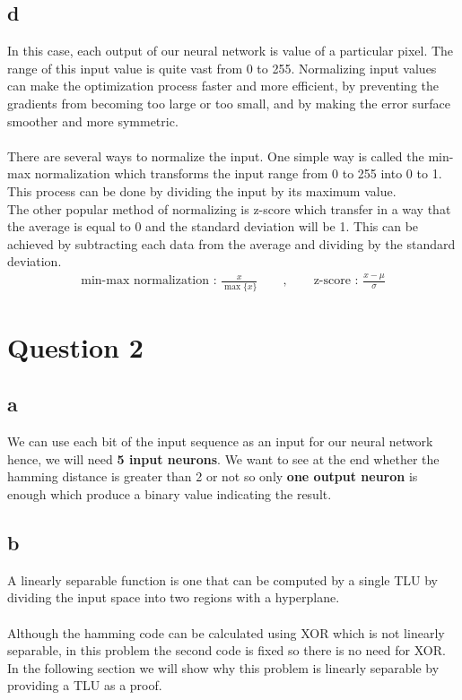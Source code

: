 \documentclass[]{article}
\begin{document}
	\subsection*{d}
	In this case, each output of our neural network is value of a particular pixel. The range of this input value is quite vast from 0 to 255. Normalizing input values can make the optimization process faster and more efficient, by preventing the gradients from becoming too large or too small, and by making the error surface smoother and more symmetric.\\\\
	There are several ways to normalize the input. One simple way is called the min-max normalization which transforms the input range from 0 to 255 into 0 to 1. This process can be done by dividing the input by its maximum value. \\
	The other popular method of normalizing is z-score which transfer in a way that the average is equal to 0 and the standard deviation will be 1. This can be achieved by subtracting each data from the average and dividing by the standard deviation.
	\begin{align*}
		\text{min-max normalization : } \frac{x}{\max\{x\}} \qquad , \qquad \text{z-score : } \frac{x - \mu}{\sigma}
	\end{align*}
	
	\section{Question 2}
	\subsection*{a}
	We can use each bit of the input sequence as an input for our neural network hence, we will need \textbf{5 input neurons}. We want to see at the end whether the hamming distance is greater than 2 or not so only \textbf{one output neuron} is enough which produce a binary value indicating the result.
	
	\subsection*{b}
	A linearly separable function is one that can be computed by a single TLU by dividing the input space into two regions with a hyperplane.\\\\
	Although the hamming code can be calculated using XOR which is not linearly separable, in this problem the second code is fixed so there is no need for XOR. In the following section we will show why this problem is linearly separable by providing a TLU as a proof.
	
\end{document}
